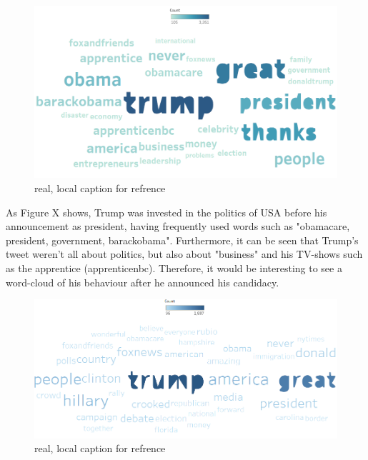 \documentclass[11pt]{article}
\begin{document}
\begin{figure}[H] %
	\centering %
\includegraphics [scale= .45]  {TrumpBeforeAnnouncementWordFinal}    %
	\caption[Optional caption] {real, local caption for refrence}
	\label{fig:wordcloudBliz}

\end{figure}

As Figure X shows, Trump was invested in the politics of USA before his announcement as president, having frequently used words such as "obamacare, president, government, barackobama". Furthermore, it can be seen that Trump's tweet weren't all about politics, but also about "business" and his TV-shows such as the apprentice (apprenticenbc). Therefore, it would be interesting to see a word-cloud of his behaviour after he announced his candidacy. 


\begin{figure}[H] %
	\centering %
\includegraphics [scale= .45]  {TrumpAfterAnnouncement}    %
	\caption[Optional caption] {real, local caption for refrence}
	\label{fig:wordcloudBliz}

\end{figure}
\end{document}
